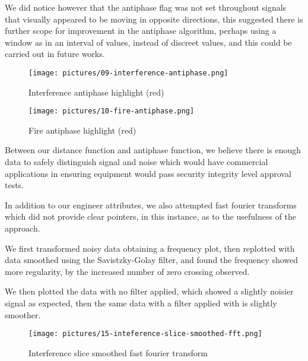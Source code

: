 We did notice however that the antiphase flag was not set throughout signals that visually appeared to be moving in opposite directions, this suggested there is further scope for improvement in the antiphase algorithm, perhaps using a window as in an interval of values, instead of discreet values, and this could be carried out in future works.

\begin{figure}[tb]
 \centering %
 \texttt{[image: pictures/09-interference-antiphase.png]}
 \caption{Interference antiphase highlight (red)}
 \label{fig:sample}
\end{figure}

\begin{figure}[tb]
 \centering %
 \texttt{[image: pictures/10-fire-antiphase.png]}
 \caption{Fire antiphase highlight (red)}
 \label{fig:sample}
\end{figure}


Between our distance function and antiphase function, we believe there is enough data to safely distinguish signal and noise which would have commercial applications in ensuring equipment would pass security integrity level approval tests. 

In addition to our engineer attributes, we also attempted fast fourier transforms which did not provide clear pointers, in this instance, as to the usefulness of the approach.

We first transformed noisy data obtaining a frequency plot, then replotted with data smoothed using the Savistzky-Golay filter, and found the frequency showed more regularity, by the increased number of zero crossing observed.

We then plotted the data with no filter applied, which showed a slightly noisier signal as expected, then the same data with a filter applied with is slightly smoother.

\begin{figure}[tb]
 \centering %
 \texttt{[image: pictures/15-inteference-slice-smoothed-fft.png]}
 \caption{Interference slice smoothed fast fourier transform}
 \label{fig:sample}
\end{figure}
